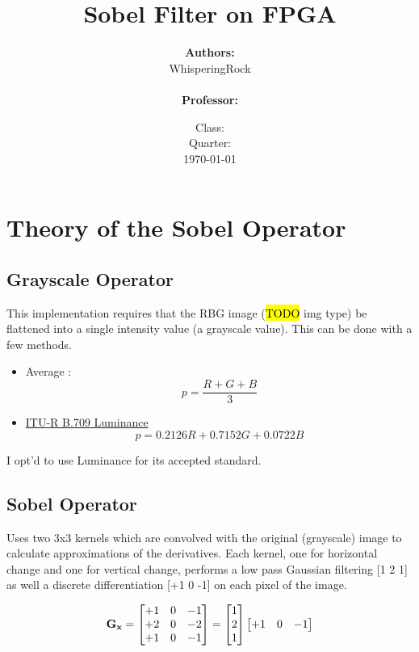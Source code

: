 \documentclass[a4paper]{report}
\title{\Huge{Sobel Filter on FPGA}}
\author{\textbf{Authors:} \\WhisperingRock \\ \\ \textbf{Professor:} \\}
\date{Class:\\ \small{Quarter}: \\ \today}
\begin{document}
    \maketitle
	\tableofcontents

	\chapter{Theory of the Sobel Operator}

		\section{Grayscale Operator}
		This implementation requires that the RBG image (\hl{TODO} img type) 
				be flattened into a single intensity value (a grayscale value). 
				This can be done with a few methods.

			\begin{itemize}
				\item Average : $$p = \frac{R + G + B}{3}$$
				\item \href{https://en.wikipedia.org/wiki/Rec._709}{ITU-R B.709 Luminance}
					\[p = 0.2126 R + 0.7152 G + 0.0722 B\]
			\end{itemize}
 
			I opt'd to use Luminance for its accepted standard.

		\section{Sobel Operator}	

			Uses two 3x3 kernels which are convolved with the original 
			(grayscale) image to calculate approximations of the derivatives. 
			Each kernel, one for horizontal change and one for vertical change, 
			performs a low pass Gaussian filtering [1 2 1] as well a discrete
			differentiation [+1 0 -1] on each pixel of the image.

			 \[
			 	\bf{G_x} =
			 	\begin{bmatrix}
			 		+1 & 0 & -1 \\
			 		+2 & 0 & -2 \\
			 		+1 & 0 & -1
			 	\end{bmatrix}
				=
			 	\begin{bmatrix} 1 \\ 2 \\ 1 \end{bmatrix}
			 	\begin{bmatrix} +1 & 0 & -1 \end{bmatrix}
			\]
\end{document}
